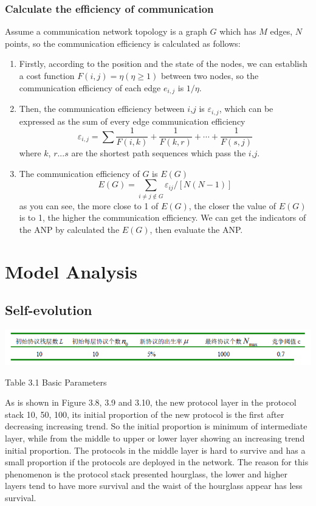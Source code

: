 \documentclass{article}
\begin{document}
\subsubsection{Calculate the efficiency of communication}
Assume a communication network topology is a graph $G$ which has $M$ edges, $N$ points, so the communication efficiency
is calculated as follows:
\begin{enumerate}
    \item Firstly,  according to the position and the state of the nodes, we can establish a cost function \(F(i,j)=\eta (\eta \ge1)\)
    between two nodes, so the communication efficiency of each edge \(e_{i,j}\) is \(1/\eta\).
    \item Then, the communication efficiency between $i$,$j$ is \(\varepsilon_{i,j}\), which can be expressed as the
    sum of every edge communication efficiency
    \begin{displaymath}
    \varepsilon_{i,j}=\sum\frac{1}{F(i,k)}+\frac{1}{F(k,r)}+\cdots+\frac{1}{F(s,j)}
    \end{displaymath}
    where $k$, $r$...$s$ are the shortest path sequences which pass the $i$,$j$.
    \item The communication efficiency of $G$ is $E(G)$
    \begin{displaymath}
    E(G)=\sum_{i\ne j\notin G}\varepsilon_{ij}/[N(N-1)]
    \end{displaymath}
    as you can see, the more close to 1 of $E(G)$, the closer the value of $E(G)$ is to 1, the higher the communication efficiency.
    We can get the indicators of the ANP by calculated the $E(G)$, then evaluate the ANP.
\end{enumerate}

\section{Model Analysis}
\subsection{Self-evolution}
\par
\centerline{\includegraphics[width=.7\textwidth]{Table3.png}}
\centerline{Table 3.1 Basic Parameters}
As is shown in Figure 3.8, 3.9 and 3.10, the new protocol layer in the protocol stack 10, 50, 100, its initial proportion
of the new protocol is the first after decreasing increasing trend. So the initial proportion is minimum of intermediate
layer, while from the middle to upper or lower layer showing an increasing trend initial proportion. The protocols in the
middle layer is hard to survive and has a small proportion if the protocols are deployed in the network. The reason for
this phenomenon is the protocol stack presented hourglass, the lower and higher layers tend to have more survival and the
waist of the hourglass appear has less survival.
\end{document}
